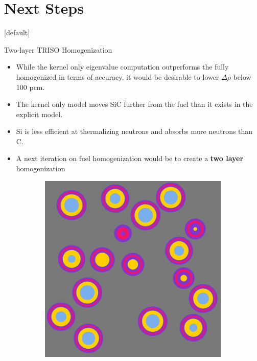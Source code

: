 \documentclass[9pt,t,aspectratio=169]{beamer}
\makeatletter
\newenvironment{withoutheadline}{
       \setbeamertemplate{headline}[default]
       \def\beamer@entrycode{\vspace*{-\headheight}}
    }{}
\makeatother
\begin{document}
\section{Next Steps}
\begin{withoutheadline}
\begin{frame}{Two-layer TRISO Homogenization}
    \pause
    \begin{itemize}
        \item<2-> While the kernel only eigenvalue computation outperforms the fully homogenized in terms of accuracy, it would be desirable to lower $\Delta \rho$ below 100 pcm.
        \item<3-> The kernel only model moves SiC further from the fuel than it exists in the explicit model.
        \item<3-> Si is less efficient at thermalizing neutrons and absorbs more neutrons than C.
        \item<4-> A next iteration on fuel homogenization would be to create a \textbf{two layer} homogenization
    \end{itemize}
    \begin{figure}
        \pause
        \pause
        \begin{subfigure}{0.3\linewidth}
            \centering
            \includegraphics[width=\linewidth]{figures/explicit_viz.png}

\end{subfigure}
\end{figure}
\end{frame}
\end{withoutheadline}
\end{document}
